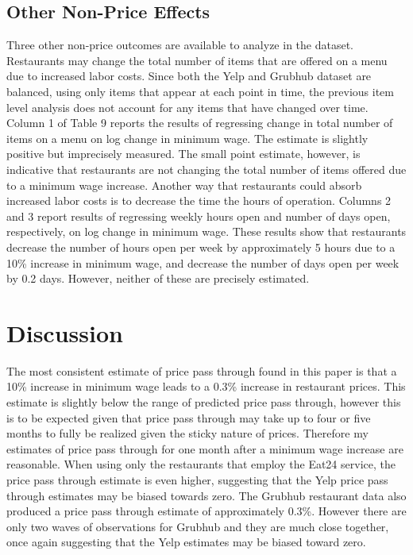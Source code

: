 \documentclass[11pt]{article}
\begin{document}
\subsection{Other Non-Price Effects}

Three other non-price outcomes are available to analyze in the dataset. Restaurants may change the total number of items that are offered on a menu due to increased labor costs. Since both the Yelp and Grubhub dataset are balanced, using only items that appear at each point in time, the previous item level analysis does not account for any items that have changed over time. Column 1 of Table 9 reports the results of regressing change in total number of items on a menu on log change in minimum wage. The estimate is slightly positive but imprecisely measured. The small point estimate, however, is indicative that restaurants are not changing the total number of items offered due to a minimum wage increase. Another way that restaurants could absorb increased labor costs is to decrease the time the hours of operation. Columns 2 and 3 report results of regressing weekly hours open and number of days open, respectively, on log change in minimum wage. These results show that restaurants decrease the number of hours open per week by approximately 5 hours due to a 10\% increase in minimum wage, and decrease the number of days open per week by 0.2 days. However, neither of these are precisely estimated.

\section{Discussion}

The most consistent estimate of price pass through found in this paper is that a 10\% increase in minimum wage leads to a 0.3\% increase in restaurant prices. This estimate is slightly below the range of predicted price pass through, however this is to be expected given that price pass through may take up to four or five months to fully be realized given the sticky nature of prices. Therefore my estimates of price pass through for one month after a minimum wage increase are reasonable. When using only the restaurants that employ the Eat24 service, the price pass through estimate is even higher, suggesting that the Yelp price pass through estimates may be biased towards zero. The Grubhub restaurant data also produced a price pass through estimate of approximately 0.3\%. However there are only two waves of observations for Grubhub and they are much close together, once again suggesting that the Yelp estimates may be biased toward zero.
\end{document}
